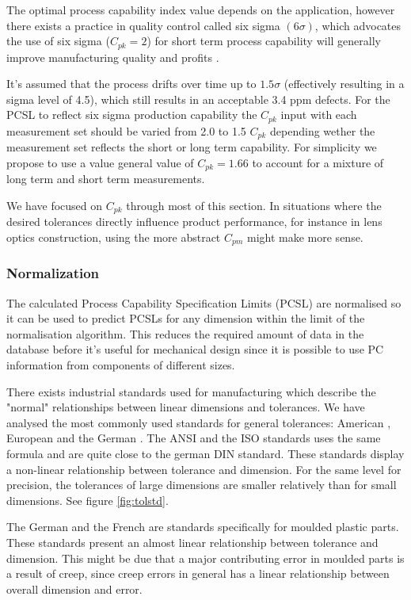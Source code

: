 \documentclass[aip,amsmath, preprint, author-year]{revtex4-1}
\begin{document}
The optimal process capability index value depends on the application, however there exists a practice in quality control called six sigma $(6 \sigma)$, which advocates the use of six sigma ($C_{pk} = 2$) for short term process capability will generally improve manufacturing quality and profits \cite{koch2004design}. 

It's assumed that the process drifts over time up to $1.5 \sigma$  (effectively resulting in a sigma level of 4.5), which still results in an acceptable 3.4 ppm defects.
For the PCSL to reflect six sigma production capability the $C_{pk}$ input with each measurement set should be varied from 2.0 to 1.5 $C_{pk}$ depending wether the measurement set reflects the short or long term capability. 
For simplicity we propose to use a value general value of $C_{pk} = 1.66$ to account for a  mixture of long term and short term measurements. 

We have focused on $C_{pk}$ through most of this section.
In situations where the desired tolerances directly influence product performance, for instance in lens optics construction, using the more abstract $C_{pm}$ might make more sense. 


\subsubsection{Normalization}
The calculated Process Capability Specification Limits (PCSL) are normalised so it can be used to predict PCSLs for any dimension within the limit of the normalisation algorithm. 
This reduces the required amount of data in the database before it's useful for mechanical design since it is possible to use PC information from components of different sizes.

There exists industrial standards used for manufacturing which describe the "normal" relationships between linear dimensions and tolerances. 
We have analysed the most commonly used standards for general tolerances: American \citeauthor{american1978preferred}, European \citeauthor{ISO286} and the German \citeauthor{DIN7168}. 
The ANSI and the ISO standards uses the same formula and are quite close to the german DIN standard. 
These standards display a non-linear relationship between tolerance and dimension. 
For the same level for precision, the tolerances of large dimensions are smaller relatively than for small dimensions. See figure \ref{fig:tolstd}.

The German \citeauthor{DIN16901} and the French \citeauthor{NFT58000} are standards specifically for moulded plastic parts. 
These standards present an almost linear relationship between tolerance and dimension. 
This might be due that a major contributing error in moulded parts is a result of creep, since creep errors in general has a linear relationship between overall dimension and error.
\end{document}
